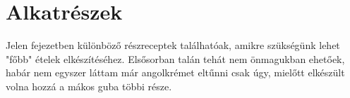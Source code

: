 \chapter{Alkatrészek} \label{ch:alkatreszek}

Jelen fejezetben különböző részreceptek találhatóak, amikre szükségünk lehet "főbb" ételek elkészítéséhez. Elsősorban talán tehát nem önmagukban ehetőek, habár nem egyszer láttam már angolkrémet eltűnni csak úgy, mielőtt elkészült volna hozzá a mákos guba többi része.


